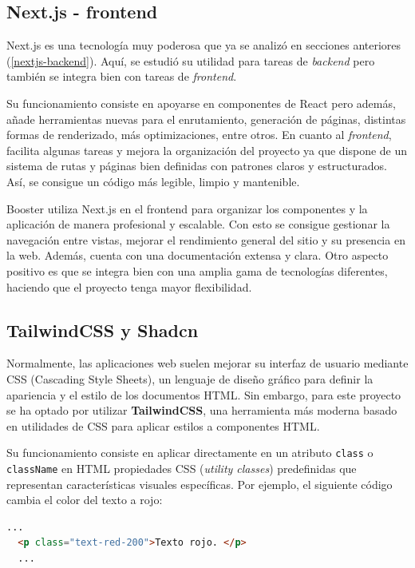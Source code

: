 \subsection{Next.js - frontend}

Next.js es una tecnología muy poderosa que ya se analizó en secciones anteriores (\ref{nextjs-backend}). Aquí, se estudió su utilidad para tareas de \textit{backend} pero también se integra bien con tareas de \textit{frontend}.

Su funcionamiento consiste en apoyarse en componentes de React pero además, añade herramientas nuevas para el enrutamiento, generación de páginas, distintas formas de renderizado, más optimizaciones, entre otros. En cuanto al \textit{frontend}, facilita algunas tareas y mejora la organización del proyecto ya que dispone de un sistema de rutas y páginas bien definidas con patrones claros y estructurados. Así, se consigue un código más legible, limpio y mantenible. 

Booster utiliza Next.js en el frontend para organizar los componentes y la aplicación de manera profesional y escalable. Con esto se consigue gestionar la navegación entre vistas, mejorar el rendimiento general del sitio y su presencia en la web. Además, cuenta con una documentación extensa y clara. Otro aspecto positivo es que se integra bien con una amplia gama de tecnologías diferentes, haciendo que el proyecto tenga mayor flexibilidad.


\subsection{TailwindCSS y Shadcn}
\label{tailwind}

Normalmente, las aplicaciones web suelen mejorar su interfaz de usuario mediante CSS (Cascading Style Sheets), un lenguaje de diseño gráfico para definir la apariencia y el estilo de los documentos HTML. Sin embargo, para este proyecto se ha optado por utilizar \textbf{TailwindCSS}, una herramienta más moderna basado en utilidades de CSS para aplicar estilos a componentes HTML. 

Su funcionamiento consiste en aplicar directamente en un atributo \lstinline|class| o \lstinline|className| en HTML propiedades CSS (\textit{utility classes}) predefinidas que representan características visuales específicas. Por ejemplo, el siguiente código cambia el color del texto a rojo:

\begin{lstlisting}[language=html]
  ...
  <p class="text-red-200">Texto rojo. </p>
  ...
\end{lstlisting}


